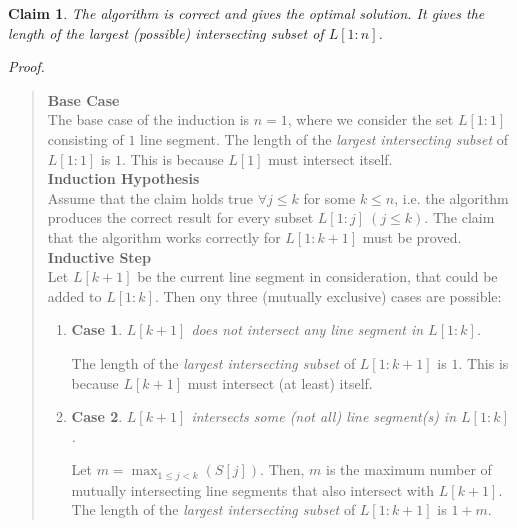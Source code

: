 \documentclass[12pt]{report}
\newtheorem{claim}{Claim}
\newtheorem{case}{Case}
\begin{document}
    \begin{claim}
        The algorithm is correct and gives the optimal solution.
        It gives the length of the \textit{largest (possible) intersecting subset} of $L[1:n]$.
    \end{claim}
    \textit{Proof.}
    \begin{quote}
        \textbf{Base Case}
        \vspace*{2.5pt} \\
        The base case of the induction is $n = 1$, where we consider the set $L[1:1]$ consisting of $1$ line segment.
        The length of the \textit{largest intersecting subset} of $L[1:1]$ is $1$.
        This is because $L[1]$ must intersect itself.
        \vspace*{7.5pt} \\
        \textbf{Induction Hypothesis}
        \vspace*{2.5pt} \\
        Assume that the claim holds true $\forall j \le k$ for some $k \le n$, i.e. the algorithm produces the correct
        result for every subset $L[1:j] \ (j \le k)$.
        The claim that the algorithm works correctly for $L[1:k+1]$ must be proved.
        \vspace*{7.5pt} \\
        \textbf{Inductive Step}
        \vspace*{2.5pt} \\
        Let $L[k+1]$ be the current line segment in consideration, that could be added to $L[1:k]$.
        Then ony three (mutually exclusive) cases are possible:
        \begin{enumerate}
            \item
            \begin{case}
                $L[k+1]$ does not intersect any line segment in $L[1:k]$.
            \end{case}
            The length of the \textit{largest intersecting subset} of $L[1:k+1]$ is $1$.
            This is because $L[k+1]$ must intersect (at least) itself.
            \item
            \begin{case}
                $L[k+1]$ intersects some (not all) line segment(s) in $L[1:k]$.
            \end{case}
            Let $m = \max_{1 \le j < k} (S[j])$.
            Then, $m$ is the maximum number of mutually intersecting line segments that also intersect with $L[k+1]$.
            The length of the \textit{largest intersecting subset} of $L[1:k+1]$ is $1 + m$.

\end{enumerate}
\end{quote}
\end{document}

